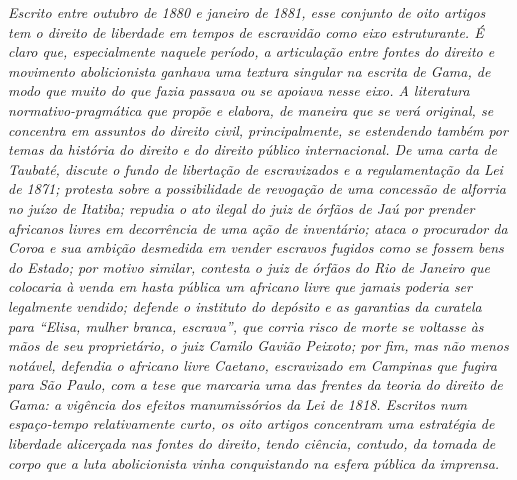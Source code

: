 \begin{didas}
\emph{Escrito entre outubro de 1880 e janeiro de 1881, esse conjunto de
oito artigos tem o direito de liberdade em tempos de escravidão como
eixo estruturante. É claro que, especialmente naquele período, a
articulação entre fontes do direito e movimento abolicionista ganhava
uma textura singular na escrita de Gama, de modo que muito do que fazia
passava ou se apoiava nesse eixo. A literatura normativo-pragmática que
propõe e elabora, de maneira que se verá original, se concentra em
assuntos do direito civil, principalmente, se estendendo também por
temas da história do direito e do direito público internacional. De uma
carta de Taubaté, discute o fundo de libertação de escravizados e a
regulamentação da Lei de 1871; protesta sobre a possibilidade de
revogação de uma concessão de alforria no juízo de Itatiba; repudia o
ato ilegal do juiz de órfãos de Jaú por prender africanos livres em
decorrência de uma ação de inventário; ataca o procurador da Coroa e sua
ambição desmedida em vender escravos fugidos como se fossem bens do
Estado; por motivo similar, contesta o juiz de órfãos do Rio de Janeiro
que colocaria à venda em hasta pública um africano livre que jamais
poderia ser legalmente vendido; defende o instituto do depósito e as
garantias da curatela para ``Elisa, mulher branca, escrava'', que corria
risco de morte se voltasse às mãos de seu proprietário, o juiz Camilo
Gavião Peixoto; por fim, mas não menos notável, defendia o africano
livre Caetano, escravizado em Campinas que fugira para São Paulo, com a
tese que marcaria uma das frentes da teoria do direito de Gama: a
vigência dos efeitos manumissórios da Lei de 1818. Escritos num
espaço-tempo relativamente curto, os oito artigos concentram uma
estratégia de liberdade alicerçada nas fontes do direito, tendo ciência,
contudo, da tomada de corpo que a luta abolicionista vinha conquistando
na esfera pública da imprensa.}
\end{didas}


